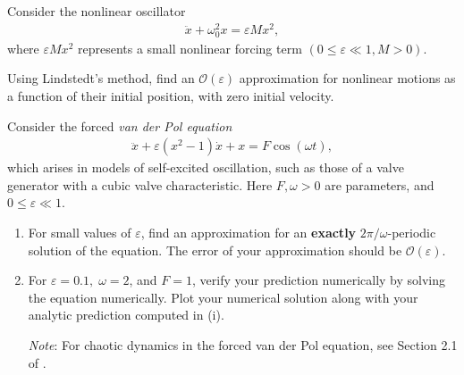 \begin{exercise}
Consider the nonlinear oscillator
\begin{align}
	\ddot{x} + \omega_0^2x = \varepsilon Mx^2,
\end{align}
where $\varepsilon M x^2$ represents a small nonlinear forcing term $(0 \leq \varepsilon \ll 1, M > 0)$.

Using Lindstedt's method, find an $\mathcal{O}(\varepsilon)$ approximation for nonlinear motions as a function of their initial position, with zero initial velocity.
\end{exercise}

\begin{exercise}
Consider the forced \emph{van der Pol equation}
\begin{align}
	\ddot{x} + \varepsilon(x^2 - 1)\dot{x} + x = F\cos(\omega t),
\end{align} 
which arises in models of self-excited oscillation, such as those of a valve generator with a cubic valve characteristic. Here $F, \omega > 0$ are parameters, and $0 \leq \varepsilon \ll 1$.

\begin{enumerate}[label=(\roman*)]
	\item For small values of $\varepsilon$, find an approximation for an \textbf{exactly} $2\pi/\omega$-periodic solution of the equation. The error of your approximation should be $\mathcal{O}(\varepsilon)$.
	\item For $\varepsilon = 0.1, \; \omega = 2$, and $F = 1$, verify your prediction numerically by solving the equation numerically. Plot your numerical solution along with your analytic prediction computed in (i).

		\textit{Note}: For chaotic dynamics in the forced van der Pol equation, see Section 2.1 of \newline\cite{GuckenheimerHolmes}.
\end{enumerate}
\end{exercise}

